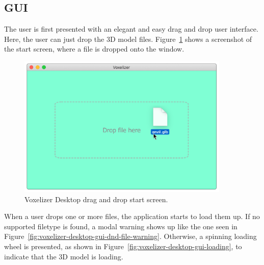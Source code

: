\subsection{GUI}
The user is first presented with an elegant and easy drag and drop user interface. Here, the user can just drop the 3D model files. Figure~\ref{fig:voxelizer-desktop-gui-dnd} shows a screenshot of the start screen, where a file is dropped onto the window.
\begin{figure}[htp]
    \centering
    \includegraphics[width=0.9\textwidth]{sections/result/figures/voxelizer-desktop-gui-dnd.png}
    \caption{Voxelizer Desktop drag and drop start screen.}
    \label{fig:voxelizer-desktop-gui-dnd}
\end{figure}

When a user drops one or more files, the application starts to load them up. If no supported filetype is found, a modal warning shows up like the one seen in Figure~\ref{fig:voxelizer-desktop-gui-dnd-file-warning}. Otherwise, a spinning loading wheel is presented, as shown in Figure~\ref{fig:voxelizer-desktop-gui-loading}, to indicate that the 3D model is loading.

